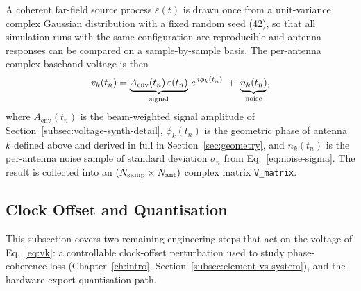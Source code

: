 A coherent far-field source process $\varepsilon(t)$ is drawn once from a
unit-variance complex Gaussian distribution with a fixed random seed (42), so
that all simulation runs with the same configuration are reproducible and
antenna responses can be compared on a sample-by-sample basis. The per-antenna
complex baseband voltage is then
\begin{equation}
  v_k(t_n) = \underbrace{A_{\mathrm{env}}(t_n)\,\varepsilon(t_n)}_{%
    \text{signal}} \,e^{\,i\phi_k(t_n)}
    \;+\; \underbrace{n_k(t_n)}_{\text{noise}},
  \label{eq:vk}
\end{equation}
where $A_\mathrm{env}(t_n)$ is the beam-weighted signal amplitude of
Section~\ref{subsec:voltage-synth-detail}, $\phi_k(t_n)$ is the geometric
phase of antenna~$k$ defined above and derived in full in
Section~\ref{sec:geometry}, and $n_k(t_n)$ is the per-antenna noise sample of
standard deviation $\sigma_n$ from Eq.~\eqref{eq:noise-sigma}. The result is
collected into an $(N_{\mathrm{samp}}\times N_{\rm ant})$ complex matrix
\texttt{V\_matrix}.

\subsection{Clock Offset and Quantisation}
\label{subsec:clock-offset}

This subsection covers two remaining engineering steps that act on the
voltage of Eq.~\eqref{eq:vk}: a controllable clock-offset perturbation used
to study phase-coherence loss (Chapter~\ref{ch:intro},
Section~\ref{subsec:element-vs-system}), and the hardware-export
quantisation path.

